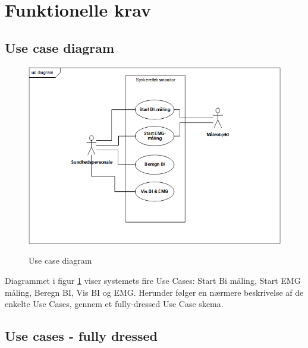 \documentclass[main.tex]{subfiles}
\begin{document}
\section{Funktionelle krav}
\subsection{Use case diagram}

\begin{figure}[H]
\centering
{\includegraphics[width=\textwidth]
{Figure/usecasediagram}}
\caption{Use case diagram}
\label{Use case diagram}
\end{figure}

Diagrammet i figur \ref{Use case diagram} viser systemets fire Use Cases: Start Bi måling, Start EMG måling, Beregn BI, Vis BI og EMG. Herunder følger en nærmere
beskrivelse af de enkelte Use Cases, gennem et fully-dressed Use Case skema.

\subsection{Use cases - fully dressed}
\end{document}

